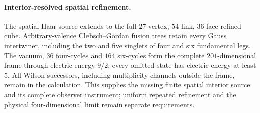 \paragraph{Interior-resolved spatial refinement.}
The spatial Haar source extends to the full $27$-vertex, $54$-link, $36$-face
refined cube. Arbitrary-valence Clebsch--Gordan fusion trees retain every Gauss
intertwiner, including the two and five singlets of four and six fundamental
legs. The vacuum, $36$ four-cycles and $164$ six-cycles form the complete
$201$-dimensional frame through electric energy $9/2$; every omitted state has
electric energy at least $5$. All Wilson successors, including multiplicity
channels outside the frame, remain in the calculation. This supplies the
missing finite spatial interior source and its complete observer instrument;
uniform repeated refinement and the physical four-dimensional limit remain
separate requirements.

